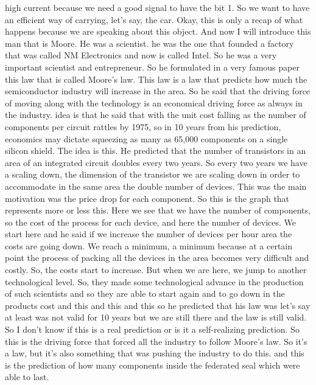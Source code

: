 high current because we need a good signal to have the bit 1. So we want to have an efficient way of carrying, let's say, the car.
Okay, this is only a recap of what happens because we are speaking about this object. And now I will introduce this man that is Moore. He was a scientist. he was the one that founded a factory that was called NM Electronics and now is called Intel. So he was a very important scientist and entrepreneur. So he formulated in a very famous paper this law that is called Moore's law. This law is a law that predicts how much the semiconductor industry will increase in the area. So he said that the driving force of moving along with the technology is an economical driving force as always in the industry. idea is that he said that with the unit cost falling as the number of components per circuit rattles by 1975, so in 10 years from his prediction, economics may dictate squeezing as many as 65,000 components on a single silicon shield. The idea is this. He predicted that the number of transistors in an area of an integrated circuit doubles every two years. So every two years we have a scaling down, the dimension of the transistor we are scaling down in order to accommodate in the same area the double number of devices. This was the main motivation was the price drop for each component. So this is the graph that represents more or less this. Here we see that we have the number of components, so the cost of the process for each device, and here the number of devices. We start here and he said if we increase the number of devices per hour area the costs are going down. We reach a minimum, a minimum because at a certain point the process of packing all the devices in the area becomes very difficult and costly. So, the costs start to increase. But when we are here, we jump to another technological level. So, they made some technological advance in the production of such scientists and so they are able to start again and to go down in the products cost and this and this and this so he predicted that his law was let's say at least was not valid for 10 years but we are still there and the law is still valid. So I don't know if this is a real prediction or is it a self-realizing prediction. So this is the driving force that forced all the industry to follow Moore's law. So it's a law, but it's also something that was pushing the industry to do this. and this is the prediction of how many components inside the federated seal which were able to last.
